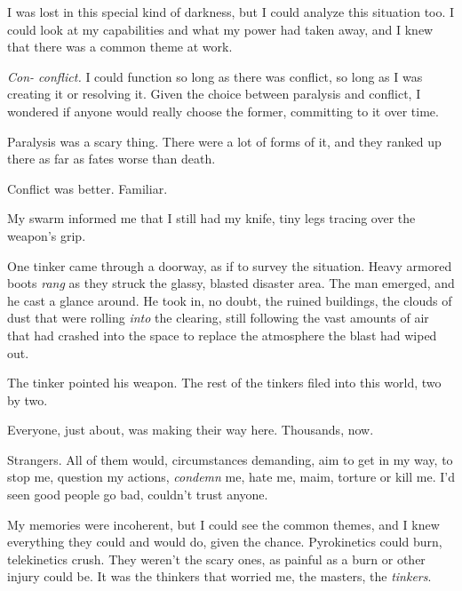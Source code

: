 I was lost in this special kind of darkness, but I could analyze this situation too.  I could look at my capabilities and what my power had taken away, and I knew that there was a common theme at work.



\emph{Con- conflict.  }I could function so long as there was conflict, so long as I was creating it or resolving it.  Given the choice between paralysis and conflict, I wondered if anyone would really choose the former, committing to it over time.



Paralysis was a scary thing.  There were a lot of forms of it, and they ranked up there as far as fates worse than death.



Conflict was better.  Familiar.



My swarm informed me that I still had my knife, tiny legs tracing over the weapon's grip.



One tinker came through a doorway, as if to survey the situation.  Heavy armored boots \emph{rang} as they struck the glassy, blasted disaster area.  The man emerged, and he cast a glance around.  He took in, no doubt, the ruined buildings, the clouds of dust that were rolling \emph{into} the clearing, still following the vast amounts of air that had crashed into the space to replace the atmosphere the blast had wiped out.



The tinker pointed his weapon.  The rest of the tinkers filed into this world, two by two.



Everyone, just about, was making their way here.  Thousands, now.



Strangers.  All of them would, circumstances demanding, aim to get in my way, to stop me, question my actions, \emph{condemn} me, hate me, maim, torture or kill me.  I'd seen good people go bad, couldn't trust anyone.



My memories were incoherent, but I could see the common themes, and I knew everything they could and would do, given the chance.  Pyrokinetics could burn, telekinetics crush.  They weren't the scary ones, as painful as a burn or other injury could be.  It was the thinkers that worried me, the masters, the \emph{tinkers}.



